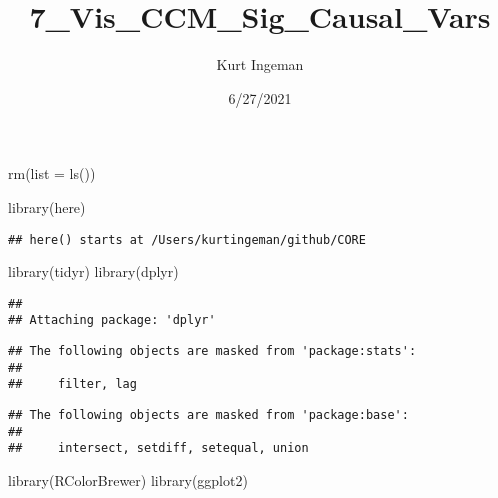 \documentclass[
]{article}
\title{7\_Vis\_CCM\_Sig\_Causal\_Vars}
\author{Kurt Ingeman}
\date{6/27/2021}
\newenvironment{Shaded}{\begin{snugshade}}{\end{snugshade}}
\newcommand{\AttributeTok}[1]{\textcolor[rgb]{0.77,0.63,0.00}{#1}}
\newcommand{\FunctionTok}[1]{\textcolor[rgb]{0.00,0.00,0.00}{#1}}
\newcommand{\NormalTok}[1]{#1}
\begin{document}
\maketitle

\begin{Shaded}
\begin{Highlighting}[]
\FunctionTok{rm}\NormalTok{(}\AttributeTok{list =} \FunctionTok{ls}\NormalTok{())}

\FunctionTok{library}\NormalTok{(here)}
\end{Highlighting}
\end{Shaded}

\begin{verbatim}
## here() starts at /Users/kurtingeman/github/CORE
\end{verbatim}

\begin{Shaded}
\begin{Highlighting}[]
\FunctionTok{library}\NormalTok{(tidyr)}
\FunctionTok{library}\NormalTok{(dplyr)}
\end{Highlighting}
\end{Shaded}

\begin{verbatim}
## 
## Attaching package: 'dplyr'
\end{verbatim}

\begin{verbatim}
## The following objects are masked from 'package:stats':
## 
##     filter, lag
\end{verbatim}

\begin{verbatim}
## The following objects are masked from 'package:base':
## 
##     intersect, setdiff, setequal, union
\end{verbatim}

\begin{Shaded}
\begin{Highlighting}[]
\FunctionTok{library}\NormalTok{(RColorBrewer)}
\FunctionTok{library}\NormalTok{(ggplot2)}
\end{Highlighting}
\end{Shaded}
\end{document}
